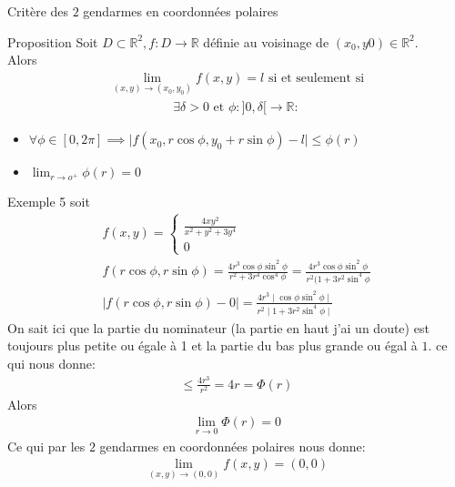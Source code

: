 \begin{parag}{Critère des $2$ gendarmes en coordonnées polaires}
    \begin{subparag}{Proposition}
        Soit $D \subset \mathbb{R}^2, f: D \to \mathbb{R}$ définie au voisinage de $(x_0, y0) \in \mathbb{R}^2$. \\
        Alors
        \begin{align*}
            \lim_{(x, y) \to (x_0, y_0)} f(x, y) = l \text{ si et seulement si}
        \end{align*}
      \begin{align*}
          \exists \delta > 0 \text{ et } \phi: ] 0 , \delta [ \to \mathbb{R}:
      \end{align*}
    \begin{itemize}
        \item $ \forall \phi \in [0, 2\pi] \implies \mid f(x_0, r\cos\phi, y_0 + r\sin\phi) - l \mid \leq \phi(r)$
        \item $\lim_{r \to o^+} \phi(r) = 0$
    \end{itemize}    
    \end{subparag}

    \begin{subparag}{Exemple 5}
       soit 
       \begin{align*}
           f(x, y) = \begin{cases}
               \frac{4xy^2}{x^2 + y^2 + 3y^4} \\
               0
           \end{cases}\\
           f(r\cos\phi, r\sin\phi) = \frac{4r^3\cos\phi\sin^2\phi}{r^2 + 3r^4\cos^4\phi} = \frac{4r^3\cos\phi\sin^2\phi}{r^2(1 + 3r^2\sin^4\phi}\\
           \mid f(r\cos\phi, r\sin\phi) - 0 \mid = \frac{4r^3 \mid \cos\phi\sin^2\phi \mid}{r^2 \mid 1 + 3r^2\sin^4\phi \mid}
       \end{align*}
       On sait ici que la partie du nominateur (la partie en haut j'ai un doute) est toujours plus petite ou égale à 1 et la partie du bas plus grande ou égal à $1$. ce qui nous donne:
       \begin{align*}
           \leq \frac{4r^3}{r^2} = 4r = \Phi(r)
       \end{align*}
       Alors 
        \begin{align*}
            \lim_{r \to 0} \Phi(r) = 0
        \end{align*}
        Ce qui par les $2$ gendarmes en coordonnées polaires nous donne:
        \begin{align*}
            \lim_{(x, y) \to (0, 0)} f(x, y) = (0, 0)
        \end{align*}
    \end{subparag}
\end{parag}
